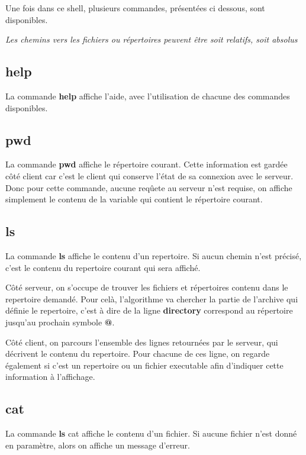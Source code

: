 \documentclass[titlepage]{article}
\begin{document}
	Une fois dans ce shell, plusieurs commandes, présentées ci dessous, sont disponibles.

	\textit{Les chemins vers les fichiers ou répertoires peuvent être soit relatifs, soit absolus}

	\subsection{help}

	La commande \textbf{help} affiche l'aide, avec l'utilisation de chacune des commandes disponibles.

	\subsection{pwd}

	La commande \textbf{pwd} affiche le répertoire courant. Cette information est gardée côté client car c'est le client qui conserve l'état de sa connexion avec le serveur. Donc pour cette commande, aucune reqûete au serveur n'est requise, on affiche simplement le contenu de la variable qui contient le répertoire courant.

	\subsection{ls}

	La commande \textbf{ls} affiche le contenu d'un repertoire. Si aucun chemin n'est précisé, c'est le contenu du repertoire courant qui sera affiché.

	Côté serveur, on s'occupe de trouver les fichiers et répertoires contenu dans le repertoire demandé. Pour celà, l'algorithme va chercher la partie de l'archive qui définie le repertoire, c'est à dire de la ligne \textbf{directory} correspond au répertoire jusqu'au prochain symbole \textbf{@}. 

	Côté client, on parcours l'ensemble des lignes retournées par le serveur, qui décrivent le contenu du repertoire. Pour chacune de ces ligne, on regarde également si c'est un repertoire ou un fichier executable afin d'indiquer cette information à l'affichage.

	\subsection{cat}

	La commande \textbf{ls} cat affiche le contenu d'un fichier. Si aucune fichier n'est donné en paramètre, alors on affiche un message d'erreur.
\end{document}
